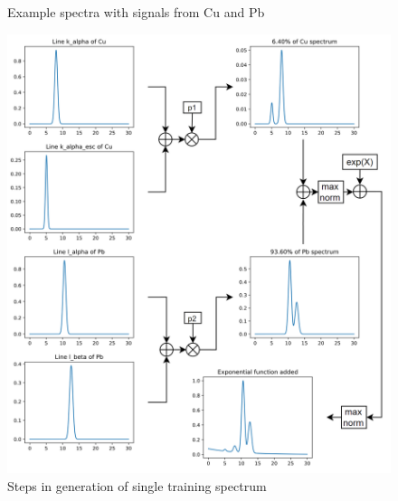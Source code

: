 \begin{figure}[H] 
  \centering     
   
  \caption{Example spectra with signals from Cu and Pb}
  \label{fig:sum-spectras}
\end{figure}

\begin{figure}[] 
  \centering     
  \includegraphics[width=1\textwidth]{img/generation_pipeline.png} 
  \caption{Steps in generation of single training spectrum}
  \label{fig:training_data_generation}
\end{figure}
